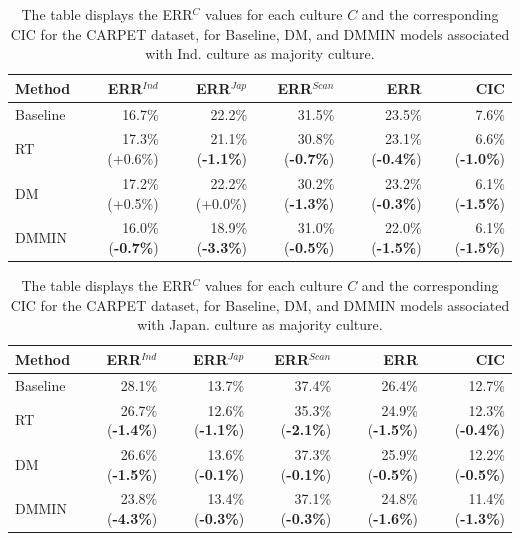 %
\begin{table}
\centering
\begin{tabular}{lrrrrr}
\toprule
\textbf{Method} & \textbf{ERR$^{Ind}$} & \textbf{ERR$^{Jap}$} & \textbf{ERR$^{Scan}$} & \textbf{ERR} & \textbf{CIC} \\
\midrule
Baseline     & 16.7\% & 22.2\% & 31.5\% & 23.5\% & 7.6\% \\
RT           & 17.3\% (+0.6\%) & 21.1\% (\textbf{-1.1\%}) & 30.8\% (\textbf{-0.7\%}) & 23.1\% (\textbf{-0.4\%}) & 6.6\% (\textbf{-1.0\%}) \\
DM           & 17.2\% (+0.5\%) & 22.2\% (+0.0\%) & 30.2\% (\textbf{-1.3\%}) & 23.2\% (\textbf{-0.3\%}) & 6.1\% (\textbf{-1.5\%}) \\
DMMIN        & 16.0\% (\textbf{-0.7\%}) & 18.9\% (\textbf{-3.3\%}) & 31.0\% (\textbf{-0.5\%}) & 22.0\% (\textbf{-1.5\%}) & 6.1\% (\textbf{-1.5\%}) \\
\bottomrule
\end{tabular}
\caption{The table displays the ERR$^C$ values for each culture $C$ and the corresponding CIC for the CARPET dataset, for Baseline, DM, and DMMIN models associated with Ind. culture as majority culture.}
\label{ch3:tab:diffCI}
\end{table}
%
%
\begin{table}
\centering
\begin{tabular}{lrrrrr}
\toprule
\textbf{Method} & \textbf{ERR$^{Ind}$} & \textbf{ERR$^{Jap}$} & \textbf{ERR$^{Scan}$} & \textbf{ERR} & \textbf{CIC} \\
\midrule						
Baseline     & 28.1\% & 13.7\% & 37.4\% & 26.4\% & 12.7\% \\
RT           & 26.7\% (\textbf{-1.4\%}) & 12.6\% (\textbf{-1.1\%}) & 35.3\% (\textbf{-2.1\%}) & 24.9\% (\textbf{-1.5\%}) & 12.3\% (\textbf{-0.4\%}) \\
DM           & 26.6\% (\textbf{-1.5\%}) & 13.6\% (\textbf{-0.1\%}) & 37.3\% (\textbf{-0.1\%}) & 25.9\% (\textbf{-0.5\%}) & 12.2\% (\textbf{-0.5\%}) \\
DMMIN        & 23.8\% (\textbf{-4.3\%}) & 13.4\% (\textbf{-0.3\%}) & 37.1\% (\textbf{-0.3\%}) & 24.8\% (\textbf{-1.6\%}) & 11.4\% (\textbf{-1.3\%}) \\
\bottomrule
\end{tabular}
\caption{The table displays the ERR$^C$ values for each culture $C$ and the corresponding CIC for the CARPET dataset, for Baseline, DM, and DMMIN models associated with Japan. culture as majority culture.}
\label{ch3:tab:diffCJ}
\end{table}
